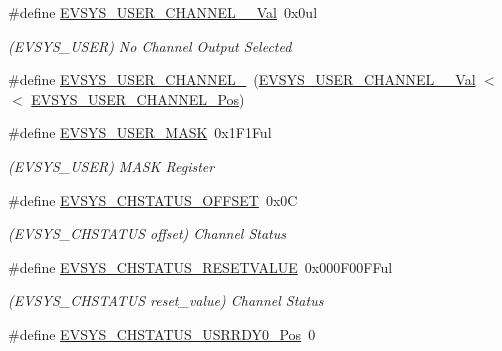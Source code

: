 \begin{DoxyCompactItemize}
\item 
\#define \mbox{\hyperlink{group___s_a_m_d21___e_v_s_y_s_ga30a3f03f14abc1097e0a8ef96c3fe706}{E\+V\+S\+Y\+S\+\_\+\+U\+S\+E\+R\+\_\+\+C\+H\+A\+N\+N\+E\+L\+\_\+\_\+\+Val}}~0x0ul
\begin{DoxyCompactList}\small\item\em (E\+V\+S\+Y\+S\+\_\+\+U\+S\+ER) No Channel Output Selected \end{DoxyCompactList}\item 
\#define \mbox{\hyperlink{group___s_a_m_d21___e_v_s_y_s_gac2728c6680cac80b7a8a51f7e367990d}{E\+V\+S\+Y\+S\+\_\+\+U\+S\+E\+R\+\_\+\+C\+H\+A\+N\+N\+E\+L\+\_}}~(\mbox{\hyperlink{group___s_a_m_d21___e_v_s_y_s_ga30a3f03f14abc1097e0a8ef96c3fe706}{E\+V\+S\+Y\+S\+\_\+\+U\+S\+E\+R\+\_\+\+C\+H\+A\+N\+N\+E\+L\+\_\+\_\+\+Val}}      $<$$<$ \mbox{\hyperlink{group___s_a_m_d21___e_v_s_y_s_ga4ce28148cd49044148eed72085814831}{E\+V\+S\+Y\+S\+\_\+\+U\+S\+E\+R\+\_\+\+C\+H\+A\+N\+N\+E\+L\+\_\+\+Pos}})
\item 
\#define \mbox{\hyperlink{group___s_a_m_d21___e_v_s_y_s_gae051bcee71e9b6fca121b9c03ff961d8}{E\+V\+S\+Y\+S\+\_\+\+U\+S\+E\+R\+\_\+\+M\+A\+SK}}~0x1\+F1\+Ful
\begin{DoxyCompactList}\small\item\em (E\+V\+S\+Y\+S\+\_\+\+U\+S\+ER) M\+A\+SK Register \end{DoxyCompactList}\item 
\#define \mbox{\hyperlink{group___s_a_m_d21___e_v_s_y_s_ga1feb1c1fba23446f2caa0e152ce7eb6c}{E\+V\+S\+Y\+S\+\_\+\+C\+H\+S\+T\+A\+T\+U\+S\+\_\+\+O\+F\+F\+S\+ET}}~0x0C
\begin{DoxyCompactList}\small\item\em (E\+V\+S\+Y\+S\+\_\+\+C\+H\+S\+T\+A\+T\+US offset) Channel Status \end{DoxyCompactList}\item 
\#define \mbox{\hyperlink{group___s_a_m_d21___e_v_s_y_s_ga3d2d7543ed2981a7d35fbee301599189}{E\+V\+S\+Y\+S\+\_\+\+C\+H\+S\+T\+A\+T\+U\+S\+\_\+\+R\+E\+S\+E\+T\+V\+A\+L\+UE}}~0x000\+F00\+F\+Ful
\begin{DoxyCompactList}\small\item\em (E\+V\+S\+Y\+S\+\_\+\+C\+H\+S\+T\+A\+T\+US reset\+\_\+value) Channel Status \end{DoxyCompactList}\item 
\#define \mbox{\hyperlink{group___s_a_m_d21___e_v_s_y_s_ga6ea71e693d005416c8deaf7964702e54}{E\+V\+S\+Y\+S\+\_\+\+C\+H\+S\+T\+A\+T\+U\+S\+\_\+\+U\+S\+R\+R\+D\+Y0\+\_\+\+Pos}}~0
$$
\end{DoxyCompactItemize}
